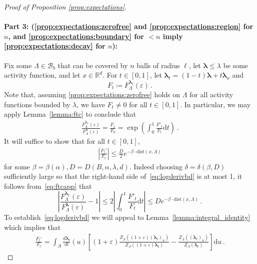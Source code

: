 \documentclass[10pt]{amsart}
\theoremstyle{definition}
\theoremstyle{remark}
\def\eps{{\varepsilon}}
\newcommand{\dist}{\mathrm{dist}}
\newcommand{\R}{\mathbb{R}}
\newcommand{\region}{\Lambda}
\newcommand{\activity}{\lambda}
\newcommand{\activities}{\pmb{\lambda}}
\newcommand{\borel}{\mathcal{B}}
\newcommand{\diff}{\mathrm{d}}
\newcommand{\absolute}[1]{\left\lvert#1\right\rvert}
\begin{document}
\begin{proof}[Proof of Proposition \ref{prop:expectations}]
		\paragraph{\texorpdfstring{\textbf{Part 3: (\ref{prop:expectations:zerofree} and \ref{prop:expectations:region} for $n$, and \ref{prop:expectations:boundary} for $<n$  imply \ref{prop:expectations:decay} for $n$)}:}{Part 3: ((i) and (ii) for n, and (iv) for < n imply (iii) for n)}}
		Fix some $\region \in \borel_b$ that can be covered by $n$ balls of radius $\ell$, let $\activities \le \activity$ be some activity function, and let $x \in \R^d$. For $t\in[0,1]$, let $\activities_t=(1-t)\activities+t \activities_x$  and
		\[
		F_t\coloneqq F_{\region}^{\activities_t}(\eps)\, .
		\]
		Note that, assuming \ref{prop:expectations:zerofree} holds on $\region$ for all activity functions bounded by $\activity$, we have $F_t\neq 0$ for all $t\in [0,1]$. In particular, we may apply Lemma~\ref{lemma:ftc} to conclude that 
		\begin{align}\label{eq:ftcapp}
			\frac{F_{\region}^{\activities_x}(\eps)}{F_{\region}^{\activities}(\eps)}= \frac{F_1}{F_0} = \exp \left(\int_{0}^1 \frac{F'_t}{F_t} \diff t \right)\, .
		\end{align}
		It will suffice to show that for all $t\in [0,1]$,
		\begin{align}\label{eq:logderivbd}
			\absolute{\frac{F_t'}{F_t}}\leq \frac{D}{2} e^{-\beta\cdot\dist(x,\region)}
		\end{align}
		for some $\beta=\beta(\alpha), D=D(B, \alpha, \lambda, d)$. Indeed choosing $\delta=\delta(\beta,D)$ sufficiently large so that the right-hand side of~\eqref{eq:logderivbd} is at most 1, 
		it follows from~\eqref{eq:ftcapp} that
		\[
		\absolute{\frac{F_{\region}^{\activities_x}(\eps)}{F_{\region}^{\activities}(\eps)}-1}\leq 2 \absolute{\int_{0}^1 \frac{F'_t}{F_t} \diff t}
		\leq 
		D e^{-\beta\cdot\dist(x,\region)}\, .
		\]
		To establish~\eqref{eq:logderivbd}  we will appeal to Lemma~\ref{lemma:integral_identity} which implies that 
		\begin{align}\label{eq:ftcagain}
			{\frac{F_t'}{F_t}}= 
			\int_\region \frac{d\activities_t}{dt}(u)
			\left[
			(1+\varepsilon)
			\frac{Z_\region((1+\varepsilon)(\activities_t)_u)}
			{Z_\region((1+\varepsilon)\activities_t)}
			-
			\frac{Z_\region((\activities_t)_u)}
			{Z_\region(\activities_t)}
			\right]
			\diff u\, .
		\end{align}
		

\end{proof}
\end{document}
